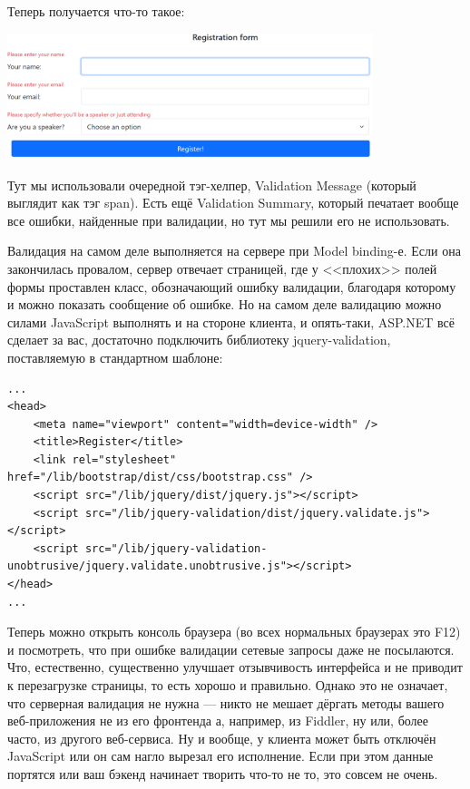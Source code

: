 \documentclass{../../text-style}
\begin{document}
Теперь получается что-то такое:

\begin{center}
    \includegraphics[width=0.8\textwidth]{validationError.png}
\end{center}

Тут мы использовали очередной тэг-хелпер, Validation Message (который выглядит как тэг span). Есть ещё Validation Summary, который печатает вообще все ошибки, найденные при валидации, но тут мы решили его не использовать.

Валидация на самом деле выполняется на сервере при Model binding-е. Если она закончилась провалом, сервер отвечает страницей, где у <<плохих>> полей формы проставлен класс, обозначающий ошибку валидации, благодаря которому и можно показать сообщение об ошибке. Но на самом деле валидацию можно силами JavaScript выполнять и на стороне клиента, и опять-таки, ASP.NET всё сделает за вас, достаточно подключить библиотеку jquery-validation, поставляемую в стандартном шаблоне:

\begin{verbatim}
...
<head>
    <meta name="viewport" content="width=device-width" />
    <title>Register</title>
    <link rel="stylesheet" href="/lib/bootstrap/dist/css/bootstrap.css" />
    <script src="/lib/jquery/dist/jquery.js"></script>
    <script src="/lib/jquery-validation/dist/jquery.validate.js"></script>
    <script src="/lib/jquery-validation-unobtrusive/jquery.validate.unobtrusive.js"></script>
</head>
...
\end{verbatim}

Теперь можно открыть консоль браузера (во всех нормальных браузерах это F12) и посмотреть, что при ошибке валидации сетевые запросы даже не посылаются. Что, естественно, существенно улучшает отзывчивость интерфейса и не приводит к перезагрузке страницы, то есть хорошо и правильно. Однако это не означает, что серверная валидация не нужна --- никто не мешает дёргать методы вашего веб-приложения не из его фронтенда а, например, из Fiddler, ну или, более часто, из другого веб-сервиса. Ну и вообще, у клиента может быть отключён JavaScript или он сам нагло вырезал его исполнение. Если при этом данные портятся или ваш бэкенд начинает творить что-то не то, это совсем не очень.
\end{document}
